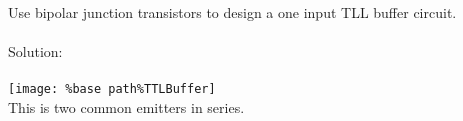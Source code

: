 Use bipolar junction transistors to design a one input TLL buffer circuit.\\ \\

Solution: \\ \\
\texttt{[image: \%base path\%TTLBuffer]}
\\
This is two common emitters in series.
